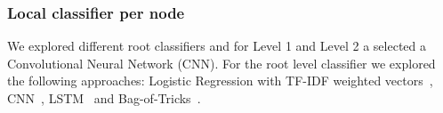 \documentclass[11pt,a4paper]{article}
\begin{document}
\begin{comment}

In all the experiments we used the concatenation of the book's title + the blurb.

- sentence + word using NLTK's german algorithm or using a simple regular expression re.findall(r'(?u)\b\w\w+\b', text)
- lowercase or original case
- remove or not stopwords


We pre-processed the data by first tokenising the blurbs into sentences, and then
from sentences into tokens. We consider the title of the book a sentence. We used
the german sentence tokeniser, and the \textit {word\_punkt\_tokenizer} both available
on NLTLK 3.4.1~\cite{Bird:2009:NLP:1717171}, also, we only considered alphanumeric
tokens, i.e., all punctuation tokens were discarded.




\end{comment}



\subsubsection{Local classifier per node}

We explored different root classifiers and for Level 1 and Level 2 a
selected a Convolutional Neural Network (CNN). For the root level classifier we
explored the following approaches: Logistic Regression with TF-IDF weighted
vectors~\cite{}, CNN~\cite{kim-2014-convolutional},
LSTM~\cite{Hochreiter:1997:LSM:1246443.1246450} and
Bag-of-Tricks~\cite{joulin-etal-2017-bag}.
\end{document}
